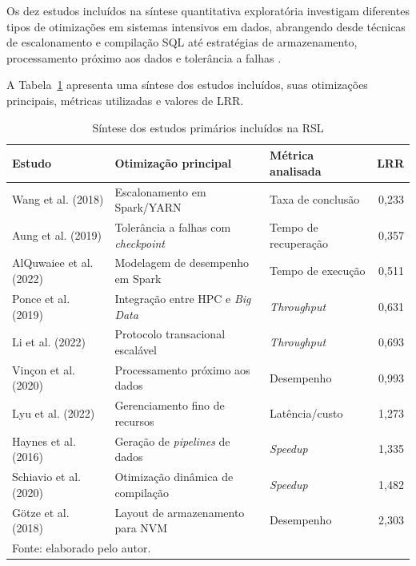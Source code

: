 Os dez estudos incluídos na síntese quantitativa exploratória investigam diferentes tipos de otimizações em sistemas intensivos em dados, abrangendo desde técnicas de escalonamento e compilação SQL até estratégias de armazenamento, processamento próximo aos dados e tolerância a falhas \cite{wang2018hard,aung2019coordinate,alquwaiee2022performance,ponce2019upgrading,li2022karst,vincon2020nkv,lyu2022fine,haynes2016pipegen,schiavio2020dynamic,gotze2018nvm-aware}.

A Tabela~\ref{tab:estudos-lrr} apresenta uma síntese dos estudos incluídos, suas otimizações principais, métricas utilizadas e valores de LRR.

\begin{table}[htbp]
\centering
\caption{Síntese dos estudos primários incluídos na RSL}
\label{tab:estudos-lrr}
\textfloatsep=10pt
\footnotesize
\setlength{\tabcolsep}{4pt}
\renewcommand{\arraystretch}{1.25}
\begin{tabular}{p{3.2cm} p{4.2cm} p{3.2cm} r}
\toprule
\textbf{Estudo} & \textbf{Otimização principal} & \textbf{Métrica analisada} & \textbf{LRR} \\ 
\midrule
Wang et al. (2018) & Escalonamento em Spark/YARN & Taxa de conclusão & 0,233 \\ 
Aung et al. (2019) & Tolerância a falhas com \textit{checkpoint} & Tempo de recuperação & 0,357 \\ 
AlQuwaiee et al. (2022) & Modelagem de desempenho em Spark & Tempo de execução & 0,511 \\ 
Ponce et al. (2019) & Integração entre HPC e \textit{Big Data} & \textit{Throughput} & 0,631 \\ 
Li et al. (2022) & Protocolo transacional escalável & \textit{Throughput} & 0,693 \\ 
Vin{\c{c}}on et al. (2020) & Processamento próximo aos dados & Desempenho & 0,993 \\ 
Lyu et al. (2022) & Gerenciamento fino de recursos & Latência/custo & 1,273 \\ 
Haynes et al. (2016) & Geração de \textit{pipelines} de dados & \textit{Speedup} & 1,335 \\ 
Schiavio et al. (2020) & Otimização dinâmica de compilação & \textit{Speedup} & 1,482 \\ 
G{\"o}tze et al. (2018) & Layout de armazenamento para NVM & Desempenho & 2,303 \\ 
\bottomrule
\multicolumn{4}{l}{\footnotesize Fonte: elaborado pelo autor.}
\end{tabular}
\end{table}


